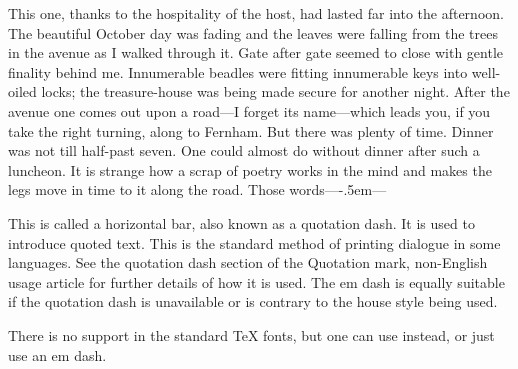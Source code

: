 \documentclass{article}
\newcommand\hemdash{\hbox{---}\kern-.5em---}
\begin{document}
This one, thanks to the hospitality of the host, had lasted far into the afternoon. The beautiful October day was fading and the leaves were falling from the trees in the avenue as I walked through it. Gate after gate seemed to close with gentle finality behind me. Innumerable beadles were fitting innumerable keys into well-oiled locks; the treasure-house was being made secure for another night. After the avenue one comes out upon a road---I forget its name---which leads you, if you take the right turning, along to Fernham. But there was plenty of time. Dinner was not till half-past seven. One could almost do without dinner after such a luncheon. It is strange how a scrap of poetry works in the mind and makes the legs move in time to it along the road. Those words\hemdash

This is called a  horizontal bar, also known as a quotation dash. It is used to introduce quoted text. This is the standard method of printing dialogue in some languages. See the quotation dash section of the Quotation mark, non-English usage article for further details of how it is used. The em dash is equally suitable if the quotation dash is unavailable or is contrary to the house style being used.

There is no support in the standard TeX fonts, but one can use  instead, or just use an em dash.
\end{document}

